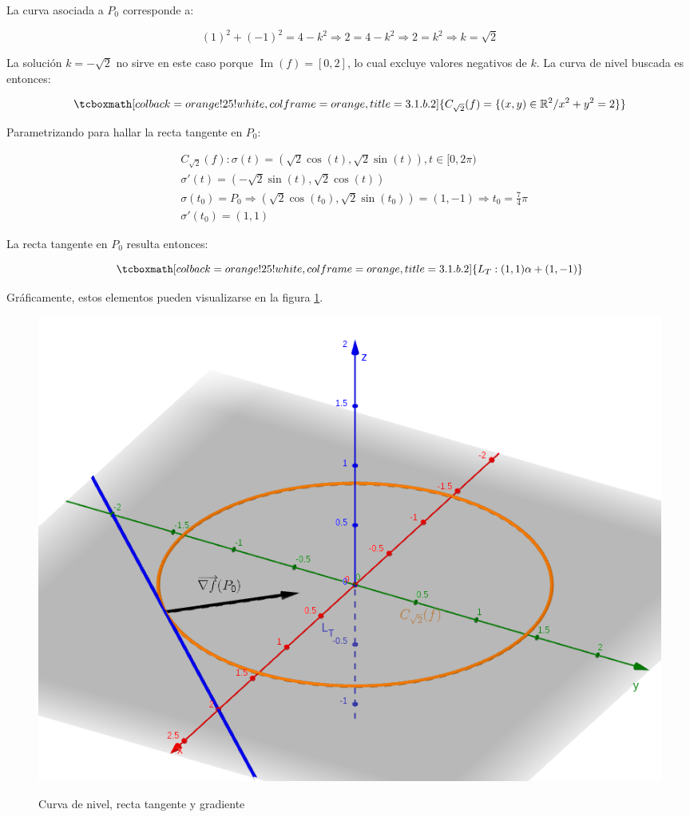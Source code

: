 \documentclass{article}
\renewcommand{\Bbb}{\mathbb}
\begin{document}
La curva asociada a $P_0$ corresponde a:

\begin{equation}
(1)^2 + (-1)^2 = 4-k^2 \Rightarrow 2 = 4-k^2 \Rightarrow 2 = k^2 \Rightarrow k = \sqrt{2}
\end{equation}

La solución $k=-\sqrt{2}$ no sirve en este caso porque $\mathop{Im}(f) = [0,2]$, lo cual excluye valores negativos de $k$. La curva de nivel buscada es entonces:

\begin{equation}
\tcboxmath[colback=orange!25!white,colframe=orange,title=3.1.b.2]
{
C_{\sqrt{2}}(f) = \{ (x,y) \in \Bbb R^2 / x^2 + y^2 = 2 \}
}
\end{equation}

Parametrizando para hallar la recta tangente en $P_0$:

\begin{subequations}
\begin{align}
& C_{\sqrt{2}}(f): \sigma(t) = (\sqrt{2} \cos(t), \sqrt{2} \sin(t)), t \in [0, 2\pi) \\
& \sigma'(t) = (-\sqrt{2} \sin(t), \sqrt{2} \cos(t)) \\
& \sigma(t_0) = P_0 \Rightarrow (\sqrt{2} \cos(t_0), \sqrt{2} \sin(t_0)) = (1, -1) \Rightarrow t_0 = \frac{7}{4} \pi \\
& \sigma'(t_0) = (1, 1)
\end{align}
\end{subequations}

La recta tangente en $P_0$ resulta entonces:

\begin{equation}
\tcboxmath[colback=orange!25!white,colframe=orange,title=3.1.b.2]
{
L_T: (1, 1) \alpha + (1, -1)
}
\end{equation}

Gráficamente, estos elementos pueden visualizarse en la figura \ref{fig:1-b-2}.

\begin{figure}[ht]
\caption{Curva de nivel, recta tangente y gradiente}
\includegraphics[scale=0.35]{img/ejercicios/3/1-b-2.png} 
\centering
\label{fig:1-b-2}
\end{figure}
\end{document}
